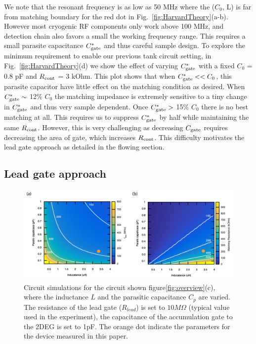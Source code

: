 \documentclass[twocolumn]{article}
\begin{document}
	
	We note that the resonant frequency is as low as 50 MHz where the ($C_0$, L) is far from matching boundary for the red dot in Fig.\ \ref{fig:HarvardTheory}(a-b). However most cryogenic RF components only work above 100 MHz, and detection chain also favors a small the working frequency range. This requires a small parasite capacitance $C^*_{\rm gate} $ and thus careful sample design. To explore the minimum requirement to enable our previous tank circuit setting, in Fig.\ \ref{fig:HarvardTheory}(d) we show the effect of varying $C^*_{\rm gate}$ with a fixed $C_0$ = 0.8 pF and $R_{\rm cont}$ = 3 kOhm.  This plot shows that when  $C^*_{\rm gate} << C_0$, this parasite capacitor have little effect on the matching condition as desired. When $C^*_{\rm gate} \sim $ 12\% $C_0$ the matching impedance is extremely sensitive to a tiny change in $C^*_{\rm gate}$ and thus very sample dependent. Once $C^*_{\rm gate}>$ 15\% $C_0$ there is no best matching at all.  This requires us to suppress $C^*_{\rm gate}$ by half while maintaining the same $R_{\rm cont}$. However, this is very challenging as decreasing $C_{\rm gate}$ requires decreasing the area of gate, which increases $R_{\rm cont}$. This difficulty motivates the lead gate approach as detailed in the flowing section.


\subsection{Lead gate approach} %
	\label{sub:lead_gate_approach}
	
	\begin{figure}
		\includegraphics[width=\columnwidth]{Illustrations/Theory_figure/theory_delft_v3.pdf}
		\caption{Circuit simulations for the circuit shown figure\ref{fig:overview}(c), where the inductance $L$ and the parasitic capacitance $C_p$ are varied. The resistance of the lead gate ($R_{lead}$) is set to $10M\Omega$ (typical value used in the experiment), the capacitance of the accumulation gate to the 2DEG is set to 1pF. The orange dot indicate the parameters for the device measured in this paper.}
		\label{fig:lead_gate_theory}
	\end{figure}
\end{document}
